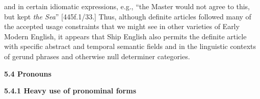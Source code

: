 \begin{styleStandard}
 and in certain idiomatic expressions, e.g., “the Master would not agree to this, but kept \textit{the Sea}” [445f.1/33.] Thus, although definite articles followed many of the accepted usage constraints that we might see in other varieties of Early Modern English, it appears that Ship English also permits the definite article with specific abstract and temporal semantic fields and in the linguistic contexts of gerund phrases and otherwise null determiner categories. 
\end{styleStandard}


\begin{styleStandard}
\textbf{5.4 Pronouns}
\end{styleStandard}


\begin{styleStandard}
\textbf{5.4.1 Heavy use of pronominal forms}
\end{styleStandard}


